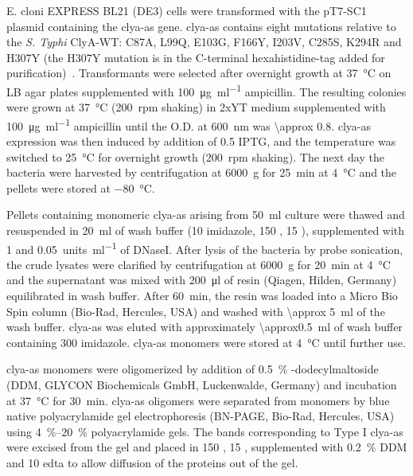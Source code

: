 E. cloni\textsuperscript{\textregistered} EXPRESS BL21 (DE3) cells were transformed with the {pT7-SC1} plasmid
containing the \gls{clya-as} gene. \gls{clya-as} contains eight mutations relative to the \textit{S. Typhi}
ClyA-WT: C87A, L99Q, E103G, F166Y, I203V, C285S, K294R and H307Y (the H307Y mutation is in the C-terminal
hexahistidine-tag added for purification)~\cite{Soskine-2013}. Transformants were selected after overnight
growth at \SI{37}{\celsius} on LB agar plates supplemented with \SI{100}{\micro\gram\per\milli\litre}
ampicillin. The resulting colonies were grown at \SI{37}{\celsius} (\SI{200}{rpm} shaking) in 2xYT medium
supplemented with \SI{100}{\micro\gram\per\milli\litre} ampicillin until the O.D. at \SI{600}{\nano\metre} was
\num{\approx 0.8}. \gls{clya-as} expression was then induced by addition of \SI{0.5}{\mM} IPTG, and the
temperature was switched to \SI{25}{\celsius} for overnight growth (\SI{200}{rpm} shaking). The next day the
bacteria were harvested by centrifugation at \SI{6000}{g} for \SI{25}{\minute} at \SI{4}{\celsius} and the
pellets were stored at \SI{-80}{\celsius}.

Pellets containing monomeric \gls{clya-as} arising from \SI{50}{\milli\litre} culture were thawed and
resuspended in \SI{20}{\milli\litre} of wash buffer (\SI{10}{\mM} imidazole, \SI{150}{\mM} ,
\SI{15}{\mM}  ), supplemented with \SI{1}{\mM}  and
\SI{0.05}{units\per\milli\litre} of DNaseI. After lysis of the bacteria by probe sonication, the crude lysates
were clarified by centrifugation at \SI{6000}{g} for \SI{20}{\minute} at \SI{4}{\celsius} and the supernatant
was mixed with \SI{200}{\micro\litre} of  resin (Qiagen, Hilden, Germany) equilibrated in wash
buffer. After \SI{60}{\minute}, the resin was loaded into a Micro Bio Spin column (Bio-Rad, Hercules, USA) and
washed with \SI{\approx 5}{\milli\litre} of the wash buffer. \gls{clya-as} was eluted with approximately
\SI{\approx0.5}{\milli\litre} of wash buffer containing \SI{300}{\mM} imidazole. \gls{clya-as} monomers were
stored at \SI{4}{\celsius} until further use.

\gls{clya-as} monomers were oligomerized by addition of \SI{0.5}{\percent} \textbeta-dodecylmaltoside (DDM,
GLYCON Biochemicals GmbH, Luckenwalde, Germany) and incubation at \SI{37}{\celsius} for \SI{30}{\minute}.
\gls{clya-as} oligomers were separated from monomers by blue native polyacrylamide gel electrophoresis
(BN-PAGE, Bio-Rad, Hercules, USA) using \SIrange{4}{20}{\percent} polyacrylamide gels. The bands corresponding
to Type I \gls{clya-as} were excised from the gel and placed in \SI{150}{\mM} , \SI{15}{\mM}
 , supplemented with \SI{0.2}{\percent} DDM and \SI{10}{\mM} \gls{edta} to allow
diffusion of the proteins out of the gel.


